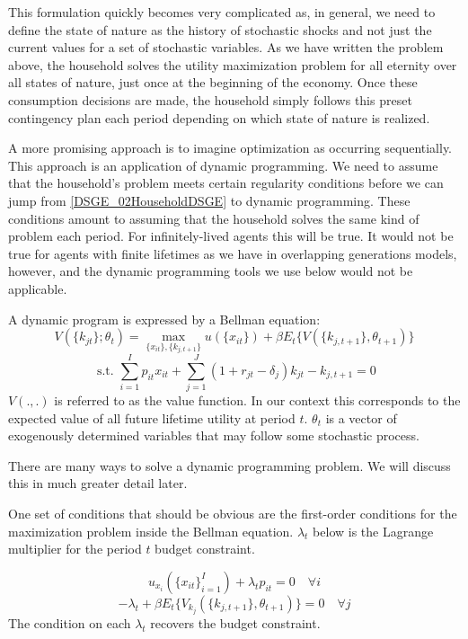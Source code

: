 \documentclass[letterpaper,12pt]{article}
\theoremstyle{definition}
\begin{document}
\begin{spacing}{1.5}
		This formulation quickly becomes very complicated as, in general, we need to define the state of nature as the history of stochastic shocks and not just the current values for a set of stochastic variables. As we have written the problem above, the household solves the utility maximization problem for all eternity over all states of nature, just once at the beginning of the economy. Once these consumption decisions are made, the household simply follows this preset contingency plan each period depending on which state of nature is realized.

		A more promising approach is to imagine optimization as occurring sequentially. This approach is an application of dynamic programming. We need to assume that the household's problem meets certain regularity conditions before we can jump from \eqref{DSGE_02HouseholdDSGE} to dynamic programming. These conditions amount to assuming that the household solves the same kind of problem each period. For infinitely-lived agents this will be true. It would not be true for agents with finite lifetimes as we have in overlapping generations models, however, and the dynamic programming tools we use below would not be applicable.

		A dynamic program is expressed by a Bellman equation:
		\begin{equation}\label{DSGE_VFHouseholdDSGE}
		 V(\{k_{jt}\};\theta_t) = \max_{\{x_{it}\},\{k_{j,t+1}\}} u(\{x_{it}\}) + \beta E_t\{V(\{k_{j,t+1}\},\theta_{t+1})\}  \nonumber
		\end{equation}
		\begin{equation}\label{DSGE_BCHouseholdDSGE}
		\text{ s.t. } \sum_{i=1}^I p_{it}x_{it} + \sum_{j=1}^J(1+r_{jt}-\delta_j)k_{jt} - k_{j,t+1} = 0
		\end{equation}
		$V(.,.)$ is referred to as the value function. In our context this corresponds to the expected value of all future lifetime utility at period $t$. $\theta_t$ is a vector of exogenously determined variables that may follow some stochastic process.

		There are many ways to solve a dynamic programming problem. We will discuss this in much greater detail later.

		One set of conditions that should be obvious are the first-order conditions for the maximization problem inside the Bellman equation. $\lambda_t$ below is the Lagrange multiplier for the period $t$ budget constraint.

		\begin{equation}\label{DSGE_FOC1HouseholdDSGE}
		u_{x_i}(\{x_{it}\}_{i=1}^I) + \lambda_t p_{it} = 0\quad \forall i
		\end{equation}
		\begin{equation}\label{DSGE_FOC2HouseholdDSGE}
		-\lambda_t + \beta E_t\{V_{k_j}(\{k_{j,t+1}\},\theta_{t+1})\} = 0\quad \forall j
		\end{equation}
		The condition on each $\lambda_t$ recovers the budget constraint.


\end{spacing}
\end{document}
